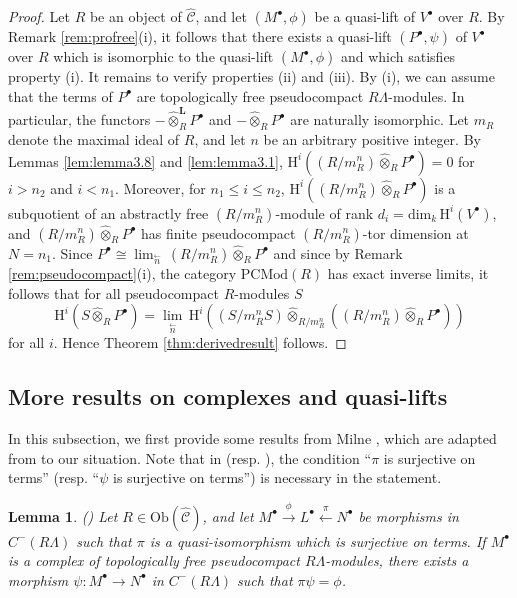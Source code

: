 \documentclass{amsart}
\theoremstyle{plain}
\newtheorem{lemma}[thm]{Lemma}
\theoremstyle{definition}
\theoremstyle{remark}
\begin{document}
\begin{proof}
Let $R$ be an object of $\hat{\mathcal{C}}$, and let $(M^\bullet,\phi)$ be a quasi-lift of $V^\bullet$ over $R$.
By Remark \ref{rem:profree}(i), it follows that there exists a quasi-lift $(P^\bullet,\psi)$ of $V^\bullet$
over $R$ which is isomorphic to the quasi-lift $(M^\bullet,\phi)$ and which satisfies property (i).
It remains to verify properties (ii) and (iii). By (i), we can assume that the terms of $P^\bullet$ 
are topologically free pseudocompact $R\Lambda$-modules. In particular, the functors 
$-\hat{\otimes}^{\mathbf{L}}_RP^\bullet$ and $-\hat{\otimes}_RP^\bullet$ are
naturally isomorphic. Let $m_R$ denote the maximal ideal of $R$, and let $n$ be an
arbitrary positive integer.
By Lemmas \ref{lem:lemma3.8} and \ref{lem:lemma3.1}, ${\mathrm{H}}^i((R/m_R^n)\hat{\otimes}_RP^\bullet)=0$ for $i>n_2$ 
and $i<n_1$. Moreover, for $n_1\le i\le n_2$,
${\mathrm{H}}^i((R/m_R^n)\hat{\otimes}_RP^\bullet)$ is a subquotient of  an abstractly free $(R/m_R^n)$-module
of rank $d_i=\mathrm{dim}_k\,{\mathrm{H}}^i(V^\bullet)$,
and $(R/m_R^n)\hat{\otimes}_RP^\bullet$ has finite pseudocompact $(R/m_R^n)$-tor dimension at
$N=n_1$. Since 
$P^\bullet\cong \displaystyle \lim_{\stackrel{\longleftarrow}{n}}\, (R/m_R^n)\hat{\otimes}_RP^\bullet$ 
and since by Remark \ref{rem:pseudocompact}(i), the category $\mathrm{PCMod}(R)$ has 
exact inverse limits, it  follows that for all pseudocompact $R$-modules $S$
$${\mathrm{H}}^i(S\hat{\otimes}_RP^\bullet)= \lim_{\stackrel{\longleftarrow}{n}}\,{\mathrm{H}}^i\left(
(S/m_R^nS)\hat{\otimes}_{R/m_R^n}\left((R/m_R^n)\hat{\otimes}_R P^\bullet\right)\right)$$ 
for all $i$. Hence Theorem \ref{thm:derivedresult} follows.
\end{proof}

\subsection{More results on complexes and quasi-lifts}
\label{s:prelims}

In this subsection, we first provide some results from Milne \cite{milne}, which
are adapted from \cite[Sect. 14]{bcderived} to our situation.
Note that in  \cite[Lemma VI.8.17]{milne} (resp.
\cite[Lemma VI.8.18]{milne}), the condition ``$\pi$ is surjective on
terms'' (resp. ``$\psi$ is surjective on terms'') is necessary in the statement.

\begin{lemma}
\label{lem:Lemma14.1}
{\rm (\cite[Lemma VI.8.17]{milne})}
Let $R\in\mathrm{Ob}(\hat{\mathcal{C}})$, and
let $M^\bullet \xrightarrow{\phi} L^\bullet \xleftarrow{\pi} N^\bullet$
be morphisms in $C^-(R\Lambda)$ such
that $\pi$ is a quasi-isomorphism which is surjective on terms.
If $M^\bullet$ is a complex of topologically free pseudocompact $R\Lambda$-modules,
there exists a morphism $\psi:M^\bullet\to N^\bullet$ in $C^-(R\Lambda)$ such that $\pi\psi=\phi$.
\end{lemma}
\end{document}
